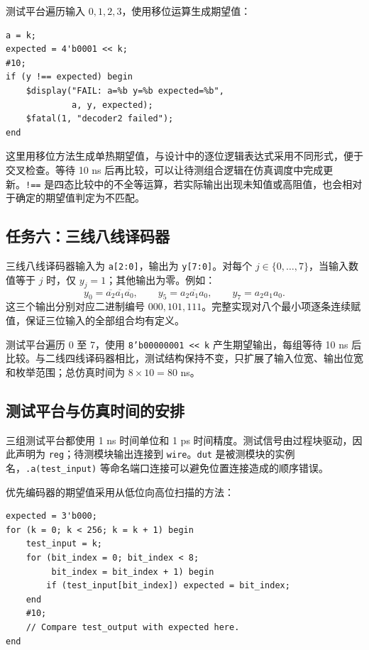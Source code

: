 \documentclass[12pt,a4paper,fontset=fandol]{ctexart}
\begin{document}
测试平台遍历输入 $0,1,2,3$，使用移位运算生成期望值：
\begin{lstlisting}[caption={二线四线译码器的期望值生成和检查}]
a = k;
expected = 4'b0001 << k;
#10;
if (y !== expected) begin
    $display("FAIL: a=%b y=%b expected=%b",
             a, y, expected);
    $fatal(1, "decoder2 failed");
end
\end{lstlisting}

这里用移位方法生成单热期望值，与设计中的逐位逻辑表达式采用不同形式，便于交叉检查。等待 10 ns 后再比较，可以让待测组合逻辑在仿真调度中完成更新。\texttt{!==} 是四态比较中的不全等运算，若实际输出出现未知值或高阻值，也会相对于确定的期望值判定为不匹配。

\subsection{任务六：三线八线译码器}

三线八线译码器输入为 \texttt{a[2:0]}，输出为 \texttt{y[7:0]}。对每个 $j\in\{0,\ldots,7\}$，当输入数值等于 $j$ 时，仅 $y_j=1$；其他输出为零。例如：
\begin{equation}
  y_0=\overline{a_2}\overline{a_1}\overline{a_0},\qquad
  y_5=a_2\overline{a_1}a_0,\qquad
  y_7=a_2a_1a_0.
\end{equation}
这三个输出分别对应二进制编号 $000,101,111$。完整实现对八个最小项逐条连续赋值，保证三位输入的全部组合均有定义。

测试平台遍历 $0$ 至 $7$，使用 \texttt{8'b00000001 << k} 产生期望输出，每组等待 10 ns 后比较。与二线四线译码器相比，测试结构保持不变，只扩展了输入位宽、输出位宽和枚举范围；总仿真时间为 $8\times10=80$ ns。

\subsection{测试平台与仿真时间的安排}

三组测试平台都使用 1 ns 时间单位和 1 ps 时间精度。测试信号由过程块驱动，因此声明为 \texttt{reg}；待测模块输出连接到 \texttt{wire}。\texttt{dut} 是被测模块的实例名，\texttt{.a(test\_input)} 等命名端口连接可以避免位置连接造成的顺序错误。

优先编码器的期望值采用从低位向高位扫描的方法：
\begin{lstlisting}[caption={现有优先编码器测试平台中的期望值计算}]
expected = 3'b000;
for (k = 0; k < 256; k = k + 1) begin
    test_input = k;
    for (bit_index = 0; bit_index < 8;
         bit_index = bit_index + 1) begin
        if (test_input[bit_index]) expected = bit_index;
    end
    #10;
    // Compare test_output with expected here.
end
\end{lstlisting}
\end{document}
